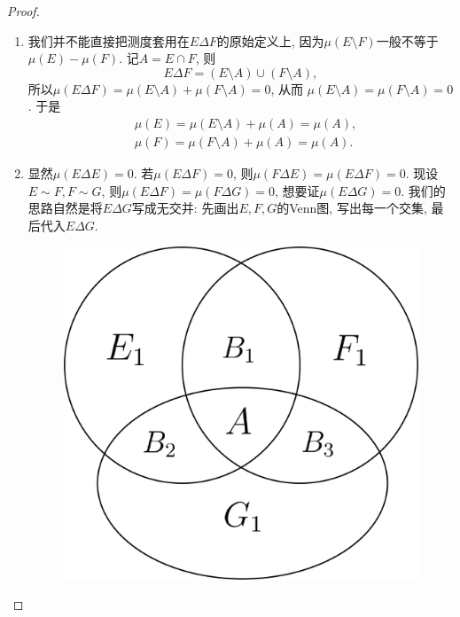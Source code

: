 \begin{proof}
    \begin{enumerate}
    \item 我们并不能直接把测度套用在$E \Delta F$的原始定义上, 因为$\mu(E \setminus F)$一般不等于$\mu(E)-\mu(F)$. 记$A=E \cap F$, 则
    $$E \Delta F = (E \setminus A) \cup (F \setminus A), $$
    所以$\mu(E \Delta F) = \mu(E \setminus A) + \mu(F \setminus A) = 0$, 从而
    $\mu(E \setminus A) = \mu(F \setminus A) = 0$.
    于是
    \begin{align*}
        &\mu(E) = \mu(E \setminus A) + \mu(A) = \mu(A), \\
        &\mu(F) = \mu(F \setminus A) + \mu(A) = \mu(A).
    \end{align*}
    \item 显然$\mu(E \Delta E) = 0$. 若$\mu(E \Delta F) = 0$, 则$\mu(F \Delta E) = \mu(E \Delta F) = 0$. 现设$E \sim F, F \sim G$, 则$\mu(E \Delta F) = \mu(F \Delta G) = 0$, 想要证$\mu(E \Delta G) = 0$. 
    我们的思路自然是将$E\Delta G$写成无交并: 先画出$E, F, G$的Venn图, 写出每一个交集, 最后代入$E \Delta G$.
    \begin{figure}[h]
        \centering
        \includegraphics[scale=0.6]{figure/Venn_1.png}
    \end{figure}
    

\end{enumerate}
\end{proof}
